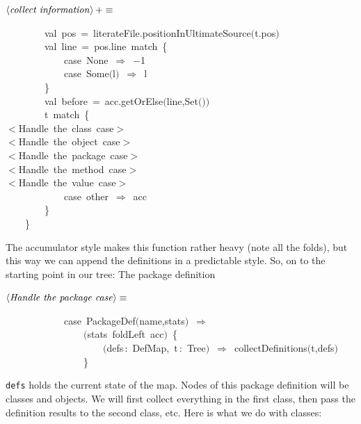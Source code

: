 \documentclass[a4paper,12pt]{article}
\begin{document}
$\left<\mbox{\emph{collect information}}\right>+\equiv$
\begin{program}~~~~~~~~{\vem val}~pos~=~literateFile.positionInUltimateSource$($t.pos$)$
\\~~~~~~~~{\vem val}~line~=~pos.line~{\vem match}~{\small\{}
\\~~~~~~~~~~~~{\vem case}~None~$\Rightarrow$~$-$1
\\~~~~~~~~~~~~{\vem case}~Some$($l$)$~$\Rightarrow$~l
\\~~~~~~~~{\small\}}
\\~~~~~~~~{\vem val}~before~=~acc.getOrElse$($line,Set$($$)$$)$
\\~~~~~~~~t~{\vem match}~{\small\{}
\\$<$Handle~the~{\vem class}~{\vem case}$>$
\\$<$Handle~the~{\vem object}~{\vem case}$>$
\\$<$Handle~the~{\vem package}~{\vem case}$>$
\\$<$Handle~the~method~{\vem case}$>$
\\$<$Handle~the~value~{\vem case}$>$
\\~~~~~~~~~~~~{\vem case}~other~$\Rightarrow$~acc
\\~~~~~~~~{\small\}}
\\~~~~{\small\}}
\\[0.5em]\end{program}
The accumulator style makes this function rather heavy (note all the folds),
but this way we can append the definitions in a predictable style. So, on to the
starting point in our tree: The package definition

$\left<\mbox{\emph{Handle the package case}}\right>\equiv$
\begin{program}~~~~~~~~~~~~{\vem case}~PackageDef$($name,stats$)$~$\Rightarrow$
\\~~~~~~~~~~~~~~~~$($stats~foldLeft~acc$)$~{\small\{}
\\~~~~~~~~~~~~~~~~~~~~$($defs\,{\rm :}~DefMap,~t\,{\rm :}~Tree$)$~$\Rightarrow$~collectDefinitions$($t,defs$)$
\\~~~~~~~~~~~~~~~~{\small\}}
\\[0.5em]\end{program}
\texttt{defs} holds the current state of the map. Nodes of this package definition
will be classes and objects. We will first collect everything in the first class,
then pass the definition results to the second class, etc. Here is what we do with
classes:
\end{document}
